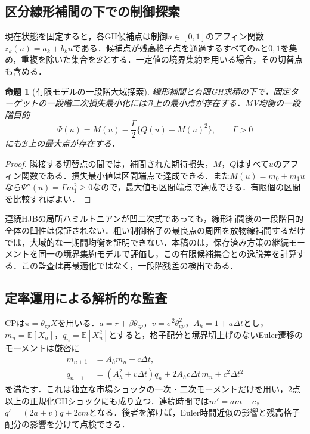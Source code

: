 \documentclass[11pt,a4paper]{article}
\numberwithin{equation}{section}
\numberwithin{table}{section}
\numberwithin{figure}{section}
\theoremstyle{plain}
\newtheorem{proposition}{命題}
\theoremstyle{definition}
\newcommand{\E}{\mathbb{E}}
\begin{document}
\subsection{区分線形補間の下での制御探索}
現在状態を固定すると，各GH候補点は制御$u\in[0,1]$のアフィン関数$z_k(u)=a_k+b_ku$である．候補点が残高格子点を通過するすべての$u$と$0,1$を集め，重複を除いた集合を$\mathcal B$とする．一定値の境界集約を用いる場合，その切替点も含める．
\begin{proposition}[有限モデルの一段階大域探索]
\label{prop:breakpoints}
線形補間と有限GH求積の下で，固定ターゲットの一段階二次損失最小化には$\mathcal B$上の最小点が存在する．MV均衡の一段階目的
\begin{equation}
\Psi(u)=M(u)-\frac\Gamma2\{Q(u)-M(u)^2\},\qquad\Gamma>0
\label{eq:psidiscrete}
\end{equation}
にも$\mathcal B$上の最大点が存在する．
\end{proposition}
\begin{proof}
隣接する切替点の間では，補間された期待損失，$M$，$Q$はすべて$u$のアフィン関数である．損失最小値は区間端点で達成できる．また$M(u)=m_0+m_1u$なら$\Psi''(u)=\Gamma m_1^2\geq0$なので，最大値も区間端点で達成できる．有限個の区間を比較すればよい．
\end{proof}
連続HJBの局所ハミルトニアンが凹二次式であっても，線形補間後の一段階目的全体の凹性は保証されない．粗い制御格子の最良点の周囲を放物線補間するだけでは，大域的な一期間均衡を証明できない．本稿のは，保存済み方策の継続モーメントを同一の境界集約モデルで評価し，この有限候補集合との逸脱差を計算する．この監査は再最適化ではなく，一段階残差の検出である．

\subsection{定率運用による解析的な監査}
\label{sec:cp}
CPは$\pi=\theta_{cp}X$を用いる．$a=r+\beta\theta_{cp}$，$v=\sigma^2\theta_{cp}^2$，$A_h=1+a\Delta t$とし，$m_n=\E[X_n]$，$q_n=\E[X_n^2]$とすると，格子配分と境界切上げのないEuler遷移のモーメントは厳密に
\begin{align}
m_{n+1}&=A_hm_n+c\Delta t,\label{eq:cpm}\\
q_{n+1}&=(A_h^2+v\Delta t)q_n+2A_hc\Delta t\,m_n+c^2\Delta t^2
\label{eq:cpq}
\end{align}
を満たす．これは独立な市場ショックの一次・二次モーメントだけを用い，2点以上の正規化GHショックにも成り立つ．連続時間では$m'=am+c$，$q'=(2a+v)q+2cm$となる．後者を解けば，Euler時間近似の影響と残高格子配分の影響を分けて点検できる．
\end{document}
